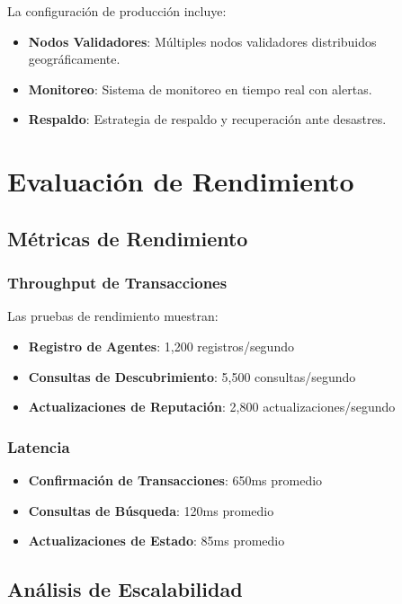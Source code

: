 \documentclass[12pt,a4paper]{article}
\begin{document}
La configuración de producción incluye:

\begin{itemize}
\item \textbf{Nodos Validadores}: Múltiples nodos validadores distribuidos geográficamente.
\item \textbf{Monitoreo}: Sistema de monitoreo en tiempo real con alertas.
\item \textbf{Respaldo}: Estrategia de respaldo y recuperación ante desastres.
\end{itemize}

\section{Evaluación de Rendimiento}

\subsection{Métricas de Rendimiento}

\subsubsection{Throughput de Transacciones}

Las pruebas de rendimiento muestran:
\begin{itemize}
\item \textbf{Registro de Agentes}: 1,200 registros/segundo
\item \textbf{Consultas de Descubrimiento}: 5,500 consultas/segundo
\item \textbf{Actualizaciones de Reputación}: 2,800 actualizaciones/segundo
\end{itemize}

\subsubsection{Latencia}

\begin{itemize}
\item \textbf{Confirmación de Transacciones}: 650ms promedio
\item \textbf{Consultas de Búsqueda}: 120ms promedio
\item \textbf{Actualizaciones de Estado}: 85ms promedio
\end{itemize}

\subsection{Análisis de Escalabilidad}
\end{document}
